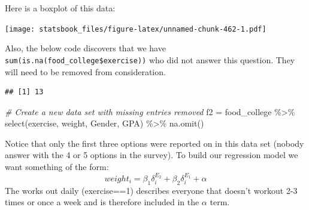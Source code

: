 \documentclass[
]{book}
\newenvironment{Shaded}{\begin{snugshade}}{\end{snugshade}}
\newcommand{\AttributeTok}[1]{\textcolor[rgb]{0.77,0.63,0.00}{#1}}
\newcommand{\CommentTok}[1]{\textcolor[rgb]{0.56,0.35,0.01}{\textit{#1}}}
\newcommand{\FunctionTok}[1]{\textcolor[rgb]{0.00,0.00,0.00}{#1}}
\newcommand{\NormalTok}[1]{#1}
\newcommand{\OtherTok}[1]{\textcolor[rgb]{0.56,0.35,0.01}{#1}}
\newcommand{\SpecialCharTok}[1]{\textcolor[rgb]{0.00,0.00,0.00}{#1}}
\newcommand{\StringTok}[1]{\textcolor[rgb]{0.31,0.60,0.02}{#1}}
\theoremstyle{definition}
\theoremstyle{definition}
\theoremstyle{definition}
\theoremstyle{definition}
\theoremstyle{remark}
\begin{document}
Here is a boxplot of this data:

\begin{Shaded}
\end{Shaded}

\texttt{[image: statsbook\_files/figure-latex/unnamed-chunk-462-1.pdf]}

Also, the below code discovers that we have \texttt{sum(is.na(food\_college\$exercise))} who did not answer this question. They will need to be removed from consideration.

\begin{Shaded}
\end{Shaded}

\begin{verbatim}
## [1] 13
\end{verbatim}

\begin{Shaded}
\begin{Highlighting}[]
\CommentTok{\# Create a new data set with missing entries removed}
\NormalTok{f2 }\OtherTok{=}\NormalTok{ food\_college }\SpecialCharTok{\%\textgreater{}\%}
    \FunctionTok{select}\NormalTok{(exercise, weight, Gender, GPA) }\SpecialCharTok{\%\textgreater{}\%}
    \FunctionTok{na.omit}\NormalTok{()}
\end{Highlighting}
\end{Shaded}

Notice that only the first three options were reported on in this data set (nobody answer with the 4 or 5 options in the survey). To build our regression model we want something of the form:
\[weight_i=\beta_1 \delta_i^{E_2}+\beta_2 \delta_i^{E_1}+\alpha\]
The works out daily (exercise==1) describes everyone that doesn't workout 2-3 times or once a week and is therefore included in the \(\alpha\) term.
\end{document}
